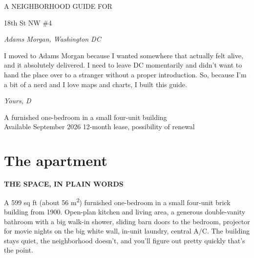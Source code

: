 \documentclass[11pt,a4paper]{article}
\newcommand{\eyebrow}[1]{{\sansheading\bfseries\footnotesize\color{brandred}\MakeUppercase{#1}\par\vspace{0.2em}}}
\begin{document}
\begin{titlepage}
\thispagestyle{empty}
\centering
\vspace*{2cm}
{\sansheading\footnotesize\color{brandred}\MakeUppercase{A neighborhood guide for}\par}
\vspace{0.4em}
{\headingfont\fontsize{42pt}{48pt} 18th St NW \#4\par}
\vspace{0.5em}
{\headingfont\itshape\Large Adams Morgan, Washington DC\par}
\vspace{2cm}

\begin{tcolorbox}[
  enhanced, colback=white, colframe=brandred, boxrule=0pt,
  borderline west={3pt}{0pt}{brandred},
  arc=0pt, left=18pt, right=18pt, top=14pt, bottom=14pt,
  width=0.78\textwidth,
]
{\sansheading\large I moved to Adams Morgan because I wanted somewhere that actually felt alive, and it absolutely delivered. I need to leave DC momentarily and didn't want to hand the place over to a stranger without a proper introduction. So, because I'm a bit of a nerd and I love maps and charts, I built this guide.}
\par\vspace{0.6em}
\hfill\textit{Yours, D}
\end{tcolorbox}

\vfill
{\sansheading\footnotesize\color{brandmuted}A furnished one-bedroom in a small four-unit building \\
Available September 2026 \textcolor{brandred}{\textbullet} 12-month lease, possibility of renewal\par}
\vspace{1.5cm}
\end{titlepage}


\thispagestyle{empty}
\renewcommand{\contentsname}{\sansheading\Huge\color{brandink} Table of contents}
\tableofcontents
\clearpage

\section{The apartment}\label{sec:apt}

\eyebrow{The space, in plain words}

A 599 sq ft (about 56 m\textsuperscript{2}) furnished one-bedroom in a small four-unit brick building from 1900. Open-plan kitchen and living area, a generous double-vanity bathroom with a big walk-in shower, sliding barn doors to the bedroom, projector for movie nights on the big white wall, in-unit laundry, central A/C. The building stays quiet, the neighborhood doesn't, and you'll figure out pretty quickly that's the point.
\end{document}
